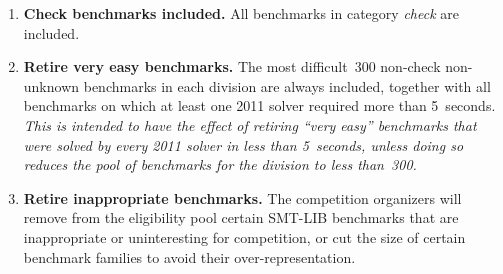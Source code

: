 \documentclass[12pt]{article}
\begin{document}
\begin{enumerate}

\item \textbf{Check benchmarks included.} %
  All benchmarks in category \emph{check} are included.

\item \textbf{Retire very easy benchmarks.} %
  The most difficult~300 non-check non-unknown benchmarks in each
  division are always included, together with all benchmarks on which
  at least one 2011 solver required more than 5~seconds.  \emph{This
    is intended to have the effect of retiring ``very easy''
    benchmarks that were solved by every 2011 solver in less
    than 5~seconds, \emph{unless} doing so reduces the pool of
    benchmarks for the division to less than~300.}

\item \textbf{Retire inappropriate benchmarks.} %
  The competition organizers will remove from the eligibility pool
  certain SMT-LIB benchmarks that are inappropriate or uninteresting
  for competition, or cut the size of certain benchmark families to
  avoid their over-representation.


\end{enumerate}
\end{document}
